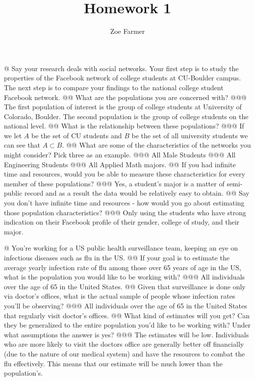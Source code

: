 \documentclass[10pt]{article}
\title{Homework 1}
\author{Zoe Farmer}
\begin{document}
\maketitle

\begin{easylist}[enumerate]
    @ Say your research deals with social networks. Your first step is to study the properties of the Facebook network of college students at CU-Boulder campus. The next step is to compare your findings to the national college student Facebook network.
    @@ What are the populations you are concerned with?
    @@@ The first population of interest is the group of college students at University of Colorado, Boulder. The second population is the group of college students on the national level.
    @@ What is the relationship between these populations?
    @@@ If we let $A$ be the set of CU students and $B$ be the set of all university students we can see that $A \subset B$.
    @@ What are some of the characteristics of the networks you might consider? Pick three as an example.
    @@@ All Male Students
    @@@ All Engineering Students
    @@@ All Applied Math majors.
    @@ If you had infinite time and resources, would you be able to measure these characteristics for every member of these populations?
    @@@ Yes, a student's major is a matter of semi-public record and as a result the data would be relatively easy to obtain.
    @@ Say you don't have infinite time and resources - how would you go about estimating those population characteristics?
    @@@ Only using the students who have strong indication on their Facebook profile of their gender, college of study, and their major.

    @ You're working for a US public health surveillance team, keeping an eye on infectious diseases such as flu in the US.
    @@ If your goal is to estimate the average yearly infection rate of flu among those over 65 years of age in the US, what is the population you would like to be working with?
    @@@ All individuals over the age of 65 in the United States.
    @@ Given that surveillance is done only via doctor's offices, what is the actual sample of people whose infection rates you'll be observing?
    @@@ All individuals over the age of 65 in the United States that regularly visit doctor's offices.
    @@ What kind of estimates will you get? Can they be generalized to the entire population you'd like to be working with? Under what assumptions the answer is yes?
    @@@ The estimates will be low. Individuals who are more likely to visit the doctors office are generally better off financially (due to the nature of our medical system) and have the resources to combat the flu effectively. This means that our estimate will be much lower than the population's.


\end{easylist}
\end{document}

